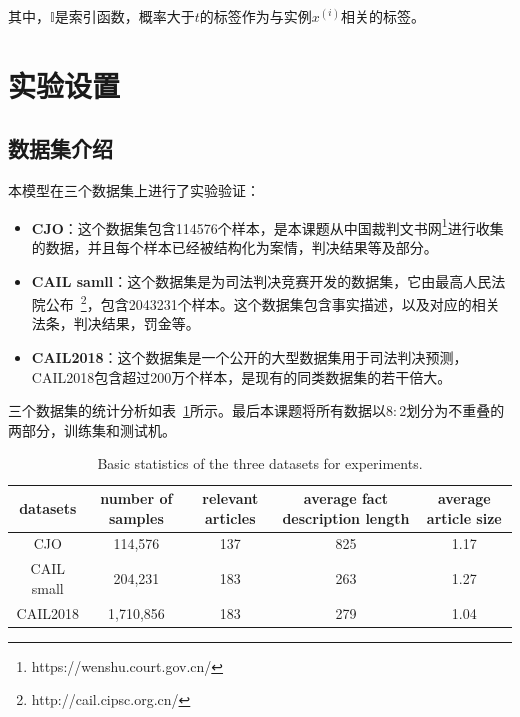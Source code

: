 其中，$\mathbb{I}$是索引函数，概率大于$t$的标签作为与实例$x^{(i)}$相关的标签。

\section{实验设置}
\label{sec:ran_exper}
\subsection{数据集介绍}
本模型在三个数据集上进行了实验验证：
\begin{itemize}
    \item \textbf{CJO}：这个数据集包含114576个样本，是本课题从中国裁判文书网\footnote{https://wenshu.court.gov.cn/}进行收集的数据，并且每个样本已经被结构化为案情，判决结果等及部分。
    \item \textbf{CAIL samll}：这个数据集是为司法判决竞赛开发的数据集，它由最高人民法院公布~\footnote{http://cail.cipsc.org.cn/}，包含2043231个样本。这个数据集包含事实描述，以及对应的相关法条，判决结果，罚金等。
    \item \textbf{CAIL2018}：这个数据集是一个公开的大型数据集\cite{zhong2018legal}用于司法判决预测，CAIL2018包含超过200万个样本，是现有的同类数据集的若干倍大。
\end{itemize}

三个数据集的统计分析如表~\ref{t:ran_statistic}所示。最后本课题将所有数据以$8:2$划分为不重叠的两部分，训练集和测试机。
\begin{table}[htbp]
    \centering
    \caption{Basic statistics of the three datasets for experiments.}
    \label{t:ran_statistic}
    \begin{tabular}{ccccc}
    \hline
    datasets   & number of samples & relevant articles & average fact description length & average article size \\ \hline
    CJO        & 114,576            & 137               & 825                             & 1.17                \\
    CAIL small & 204,231            & 183               & 263                             & 1.27                 \\
    CAIL2018   & 1,710,856           & 183               & 279                             & 1.04                \\  \hline
    \end{tabular}
\end{table}


